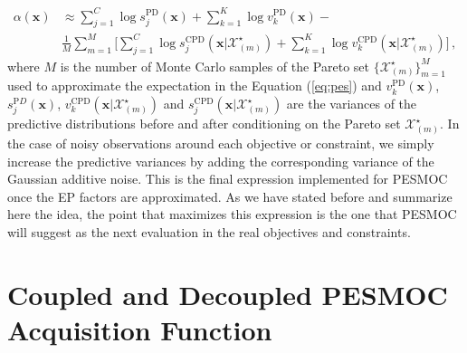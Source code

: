\begin{align}
\alpha(\textbf{x})  & \approx  \sum_{j=1}^{C}\log s_j^{\text{PD}}(\textbf{x}) + \sum_{k=1}^{K}\log v_k^{\text{PD}}(\textbf{x})
                - \nonumber \\ & \frac{1}{M}\sum_{m=1}^{M} \Big[ \sum_{j=1}^{C}\log s_j^{\text{CPD}}(\textbf{x}|\mathcal{X}^{\star}_{(m)}) + 
                \sum_{k=1}^{K}\log v_k^{\text{CPD}} (\textbf{x}|\mathcal{X}^{\star}_{(m)}) \Big]
\,, \label{eq:pesmoc}
\end{align}
where $M$ is the number of Monte Carlo samples of the Pareto set $\{\mathcal{X}^\star_{(m)}\}_{m=1}^M$
used to approximate the expectation in the Equation (\ref{eq:pes})
and ${v}_k^{\text{PD}}(\textbf{x})$, ${s}_j^{\text{P}D}(\textbf{x})$,
${v}_k^{\text{CPD}}(\textbf{x}|\mathcal{X}^{\star}_{(m)})$ and ${s}_j^{\text{CPD}}(\textbf{x}|\mathcal{X}^{\star}_{(m)})$
are the variances of the predictive distributions before and after conditioning on the Pareto
set $\mathcal{X}^{\star}_{(m)}$. In the case of noisy observations around each
objective or constraint, we simply increase the predictive variances by adding the corresponding variance
of the Gaussian additive noise. This is the final expression implemented for PESMOC once the EP factors are approximated. As we have stated before and summarize here the idea, the point that maximizes this expression is the one that PESMOC will suggest as the next evaluation in the real objectives and constraints.

\section{Coupled and Decoupled PESMOC Acquisition Function}


